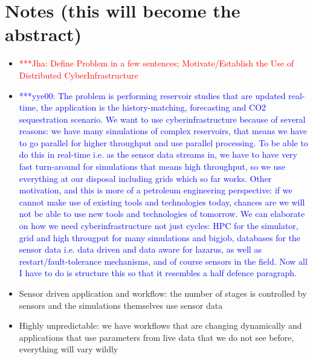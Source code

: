 \documentclass[conference,final]{IEEEtran}
\newcommand{\jhanote}[1]{ {\textcolor{red} { ***Jha: #1 }}}
\newcommand{\yyenote}[1]{ {\textcolor{blue} { ***yye00: #1 }}}
\newcommand{\jhanote}[1]{}
\newcommand{\yyenote}[1]{}
\begin{document}

\section*{Notes (this will become the abstract)}

\begin{itemize}
\item \jhanote{Define Problem in a few sentences; Motivate/Establish the Use of Distributed CyberInfrastructure}
\item \yyenote{ The problem is performing reservoir studies that are updated real-time, the application is the history-matching, forecasting and CO2 sequestration scenario. We want to use cyberinfrastructure because of several reasons: we have many simulations of complex reservoirs, that means we have to go parallel for higher throughput and use parallel processing. To be able to do this in real-time i.e. as the sensor data streams in, we have to have very fast turn-around for simulations that means high throughput, so we use everything at our disposal including grids which so far works. Other motivation, and this is more of a petroleum engineering perspective: if we cannot make use of existing tools and technologies today, chances are we will not be able to use new tools and technologies of tomorrow. We can elaborate on how we need cyberinfrastructure not just cycles: HPC for the simulator, grid and high througput for many simulations and bigjob, databases for the sensor data i.e. data driven and data aware for lazarus, as well as restart/fault-tolerance mechanisms, and of course sensors in the field. Now all I have to do is structure this so that it resembles a half defence paragraph. }
 \item Sensor driven application and workflow: the number of stages is controlled by sensors and the simulations themselves use sensor data
 \item Highly unpredictable: we have workflows that are changing dynamically and applications that use parameters from live data that we do not see before, everything will vary wildly


\end{itemize}
\end{document}
